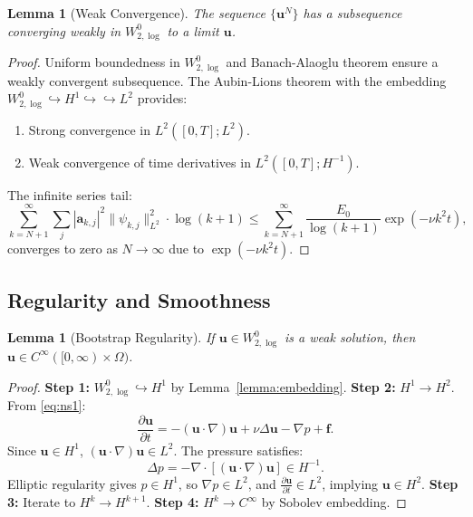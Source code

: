 \documentclass[12pt]{article}
\newtheorem{lemma}[theorem]{Lemma}
\begin{document}
\begin{lemma}[Weak Convergence]
\label{lemma:weak_convergence}
The sequence $\{\mathbf{u}^N\}$ has a subsequence converging weakly in 
$W^0_{2,\log}$ to a limit $\mathbf{u}$.
\end{lemma}

\begin{proof}
Uniform boundedness in $W^0_{2,\log}$ and Banach-Alaoglu theorem ensure a 
weakly convergent subsequence. The Aubin-Lions theorem with the embedding 
$W^0_{2,\log} \hookrightarrow H^1 \hookrightarrow\hookrightarrow L^2$ provides:
\begin{enumerate}
  \item Strong convergence in $L^2([0,T]; L^2)$.
  \item Weak convergence of time derivatives in $L^2([0,T]; H^{-1})$.
\end{enumerate}
The infinite series tail:
\begin{equation}
\sum_{k=N+1}^\infty \sum_j |\mathbf{a}_{k,j}|^2 \|\psi_{k,j}\|^2_{L^2} \cdot 
\log(k + 1) \leq \sum_{k=N+1}^\infty \frac{E_0}{\log(k + 1)} \exp(-\nu k^2 t),
\end{equation}
converges to zero as $N \to \infty$ due to $\exp(-\nu k^2 t)$.
\end{proof}

\subsection{Regularity and Smoothness}
\begin{lemma}[Bootstrap Regularity]
\label{lemma:bootstrap}
If $\mathbf{u} \in W^0_{2,\log}$ is a weak solution, then 
$\mathbf{u} \in C^\infty([0,\infty) \times \Omega)$.
\end{lemma}

\begin{proof}
\textbf{Step 1:} $W^0_{2,\log} \hookrightarrow H^1$ by Lemma~\ref{lemma:embedding}.
\textbf{Step 2:} $H^1 \to H^2$. From \eqref{eq:ns1}:
\begin{equation}
\frac{\partial \mathbf{u}}{\partial t} = -(\mathbf{u} \cdot \nabla)\mathbf{u} + 
\nu \Delta \mathbf{u} - \nabla p + \mathbf{f}.
\end{equation}
Since $\mathbf{u} \in H^1$, $(\mathbf{u} \cdot \nabla)\mathbf{u} \in L^2$. 
The pressure satisfies:
\begin{equation}
\Delta p = -\nabla \cdot [(\mathbf{u} \cdot \nabla)\mathbf{u}] \in H^{-1}.
\end{equation}
Elliptic regularity gives $p \in H^1$, so $\nabla p \in L^2$, and 
$\frac{\partial \mathbf{u}}{\partial t} \in L^2$, implying $\mathbf{u} \in H^2$.
\textbf{Step 3:} Iterate to $H^k \to H^{k+1}$. \textbf{Step 4:} 
$H^k \to C^\infty$ by Sobolev embedding.
\end{proof}
\end{document}
